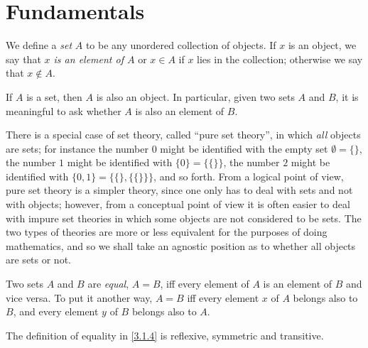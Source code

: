 \section{Fundamentals}\label{sec:3.1}

\begin{defn}\label{3.1.1}
  We define a \emph{set} \(A\) to be any unordered collection of objects.
  If \(x\) is an object, we say that \emph{\(x\) is an element of \(A\)} or \(x \in A\) if \(x\) lies in the collection;
  otherwise we say that \(x \notin A\).
\end{defn}

\begin{ax}\label{3.1}
  If \(A\) is a set, then \(A\) is also an object.
  In particular, given two sets \(A\) and \(B\), it is meaningful to ask whether \(A\) is also an element of \(B\).
\end{ax}

\setcounter{thm}{2}
\begin{rmk}\label{3.1.3}
  There is a special case of set theory, called ``pure set theory'', in which \emph{all} objects are sets;
  for instance the number \(0\) might be identified with the empty set \(\emptyset = \{\}\), the number \(1\) might be identified with \(\{0\} = \{\{\}\}\), the number \(2\) might be identified with \(\{0, 1\} = \{\{\}, \{\{\}\}\}\), and so forth.
  From a logical point of view, pure set theory is a simpler theory, since one only has to deal with sets and not with objects;
  however, from a conceptual point of view it is often easier to deal with impure set theories in which some objects are not considered to be sets.
  The two types of theories are more or less equivalent for the purposes of doing mathematics, and so we shall take an agnostic position as to whether all objects are sets or not.
\end{rmk}

\begin{defn}\label{3.1.4}
  Two sets \(A\) and \(B\) are \emph{equal}, \(A = B\), iff every element of \(A\) is an element of \(B\) and vice versa.
  To put it another way, \(A = B\) iff every element \(x\) of \(A\) belongs also to \(B\), and every element \(y\) of \(B\) belongs also to \(A\).
\end{defn}

\begin{ac}\label{ac:3.1.1}
  The definition of equality in \cref{3.1.4} is reflexive, symmetric and transitive.
\end{ac}

